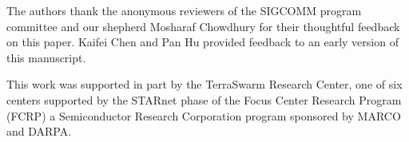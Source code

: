 \begin{acks}
  The authors thank the anonymous reviewers of the SIGCOMM program committee and
  our shepherd Mosharaf Chowdhury for their thoughtful feedback on this paper.
  Kaifei Chen and Pan Hu provided feedback to an early version of this
  manuscript.

  This work was supported in part by the TerraSwarm Research Center, one of six
  centers supported by the STARnet phase of the Focus Center Research Program
  (FCRP) a Semiconductor Research Corporation program sponsored by MARCO and
  DARPA.
\end{acks}

